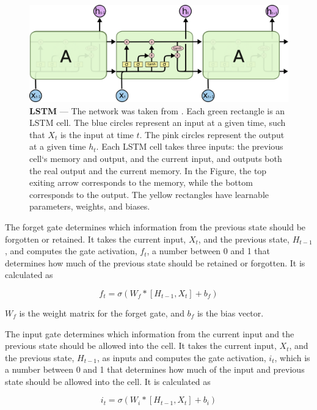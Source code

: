 \begin{figure}[ht]
    \centering
    \includegraphics[width=\textwidth]{figures/2-sota/LSTM3-chain.png}
    \caption[Long Short-Term Memory]{\textbf{\Acf{LSTM}} --- 
    The network was taken from \cite{christopher_olah_understanding_2015}. Each green rectangle is an \ac{LSTM} cell. The blue circles represent an input at a given time, such that $X_t$ is the input at time $t$. The pink circles represent the output at a given time $h_t$. Each \ac{LSTM} cell takes three inputs: the previous cell`s memory and output, and the current input, and outputs both the real output and the current memory. In the Figure, the top exiting arrow corresponds to the memory, while the bottom corresponds to the output. The yellow rectangles have learnable parameters, weights, and biases.}
    \label{fig:lstm}
\end{figure}

The forget gate determines which information from the previous state should be forgotten or retained. It takes the current input, $X_t$, and the previous state, $H_{t-1}$, and computes the gate activation, $f_t$, a number between 0 and 1 that determines how much of the previous state should be retained or forgotten. It is calculated as

\begin{equation}
    f_t = \sigma (W_f * [H_{t-1}, X_t] + b_f)    
\end{equation}

$W_f$ is the weight matrix for the forget gate, and $b_f$ is the bias vector.

The input gate determines which information from the current input and the previous state should be allowed into the cell. It takes the current input, $X_t$, and the previous state, $H_{t-1}$, as inputs and computes the gate activation, $i_t$, which is a number between 0 and 1 that determines how much of the input and previous state should be allowed into the cell. It is calculated as

\begin{equation}
    i_t = \sigma (W_i * [H_{t-1}, X_t] + b_i)
\end{equation}

